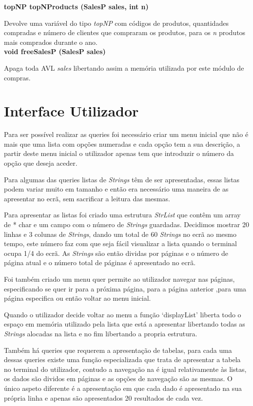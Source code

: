\documentclass[10pt] {article}
\begin{document}
\noindent \textbf {topNP topNProducts (SalesP sales, int n)}
\par Devolve uma variável do tipo \emph{topNP} com códigos de produtos, quantidades compradas e número de 
clientes que compraram os produtos, para os \emph{n} produtos mais comprados durante o ano.\\

\noindent \textbf {void freeSalesP (SalesP sales)}
\par Apaga toda AVL \emph{sales} libertando assim a memória utilizada por este módulo de compras.\\

\section{Interface Utilizador}
\par Para ser possível realizar as queries foi necessário criar um menu inicial que não é mais que uma lista 
com opções numeradas e cada opção tem a sua descrição, a partir deste menu inicial o utilizador apenas 
tem que introduzir o número da opção que deseja aceder.
\par Para algumas das queries listas de \emph{Strings} têm de ser apresentadas, essas listas podem variar 
muito  em tamanho e então era necessário uma maneira de as apresentar no ecrã, sem sacrificar a leitura das 
mesmas. 
\par Para apresentar as listas foi criado uma estrutura \emph{StrList} que contêm um array de {* char} e um campo 
com o número de \emph{Strings} guardadas. Decidimos mostrar 20 linhas e 3 colunas de \emph{Strings}, 
dando um total de 60 \emph{Strings} no ecrã ao mesmo tempo, este número faz com que seja fácil visualizar a lista 
quando o terminal ocupa 1/4 do ecrã. As \emph{Strings} são então dividas por páginas e o número de página 
atual e o número total de páginas é apresentado no ecrã.
\par Foi também criado um menu quer permite ao utilizador navegar nas páginas, especificando se quer ir para a 
próxima página, para a página anterior ,para uma página especifica ou então voltar ao menu inicial.
\par Quando o utilizador decide voltar ao menu a função `displayList' liberta todo o espaço em memória utilizado 
pela lista que está a apresentar libertando todas as \emph{Strings} alocadas na lista e no fim libertando a propria 
estrutura.
\par Também há queries que requerem a apresentação de tabelas, para cada uma dessas queries existe uma 
função especializada que trata de apresentar a tabela no terminal do utilizador, contudo a navegação na é 
igual relativamente às listas, os dados são dividos em páginas e as opções de navegação são as mesmas. O único 
aspeto diferente é a apresentação em que cada dado é apresentado na sua própria linha e apenas são 
apresentados 20 resultados de cada vez.
\end{document}
